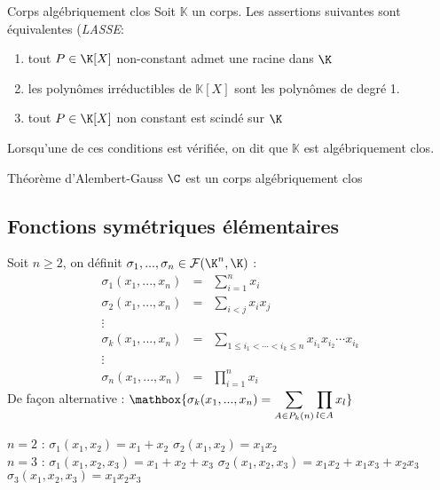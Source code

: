 \documentclass[12pt,a4paper]{report}
\begin{document}
\begin{definition}{Corps algébriquement clos}{}
Soit $\mathbb{K}$ un corps. Les assertions suivantes sont équivalentes (\textit{LASSE}:
\begin{enumerate}
\item tout $P \in \K[X]$ non-constant admet une racine dans $\K$
\item les polynômes irréductibles de $\mathbb{K}\left[X\right]$ sont les
polynômes de degré 1.
\item tout $P \in \K[X]$ non constant est scindé sur $\K$
\end{enumerate}
Lorsqu'une de ces conditions est vérifiée, on dit que $\mathbb{K}$
est algébriquement clos.
\end{definition}

\begin{demo}

\end{demo}

\begin{theoreme}{Théorème d'Alembert-Gauss}{}
$\C$ est un corps algébriquement clos
\end{theoreme}



\subsection{Fonctions symétriques élémentaires}
Soit $n \geq 2$, on définit $\sigma_1 ,..., \sigma_n \in \mathcal{F}(\K^n, \K)$ :
\begin{eqnarray*}
\sigma_{1}\left(x_1 , ..., x_n\right) & = & \sum^n_{i=1} {x_{i}}\\
\sigma_{2}\left(x_1 , ..., x_n\right) & = & \sum_{i<j} {x_{i}x_{j}}\\
\vdots\\
\sigma_{k}\left(x_1 , ..., x_n\right) & = & \sum_{1\leqslant i_{1}<\cdots<i_{k}\leqslant n} {x_{i_{1}}x_{i_{2}}\cdots x_{i_{k}}}\\
\vdots\\
\sigma_{n}\left(x_1 , ..., x_n\right) & = & \prod^n_{i=1} {x_{i}}
\end{eqnarray*}
De façon alternative : $\mathbox{\sigma_k (x_1, ..., x_n) = \displaystyle\sum_{A \in P_k (n)} \displaystyle\prod_{l\in A} x_l}$

\begin{exemple}
$n=2$ : $\sigma_1 (x_1 ,x_2) =  x_1 + x_2$ \: \: \: $\sigma_2 (x_1 , x_2) =  x_1 x_2$ \\
$n=3$ : $\sigma_1 (x_1 ,x_2, x_3) =  x_1 + x_2 + x_3$ \: \: \: $\sigma_2 (x_1 , x_2 , x_3) =  x_1 x_2 + x_1 x_3 + x_2 x_3$ \: \: \: $\sigma_3 (x_1 ,x_2, x_3) =  x_1 x_2 x_3$
\end{exemple}
\end{document}
